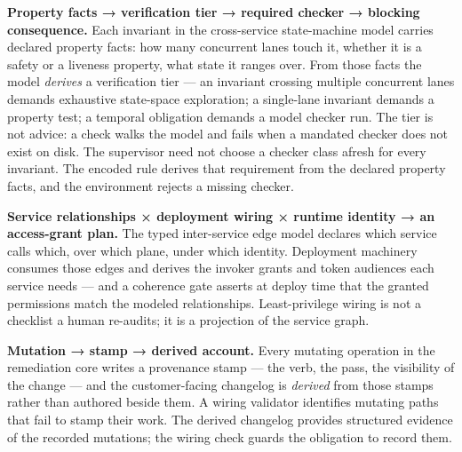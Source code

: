 
\textbf{Property facts → verification tier → required checker → blocking consequence.} Each invariant in the cross-service state-machine model carries declared property facts: how many concurrent lanes touch it, whether it is a safety or a liveness property, what state it ranges over. From those facts the model \emph{derives} a verification tier --- an invariant crossing multiple concurrent lanes demands exhaustive state-space exploration; a single-lane invariant demands a property test; a temporal obligation demands a model checker run. The tier is not advice: a check walks the model and fails when a mandated checker does not exist on disk. The supervisor need not choose a checker class afresh for every invariant. The encoded rule derives that requirement from the declared property facts, and the environment rejects a missing checker.


\textbf{Service relationships × deployment wiring × runtime identity → an access-grant plan.} The typed inter-service edge model declares which service calls which, over which plane, under which identity. Deployment machinery consumes those edges and derives the invoker grants and token audiences each service needs --- and a coherence gate asserts at deploy time that the granted permissions match the modeled relationships. Least-privilege wiring is not a checklist a human re-audits; it is a projection of the service graph.


\textbf{Mutation → stamp → derived account.} Every mutating operation in the remediation core writes a provenance stamp --- the verb, the pass, the visibility of the change --- and the customer-facing changelog is \emph{derived} from those stamps rather than authored beside them. A wiring validator identifies mutating paths that fail to stamp their work. The derived changelog provides structured evidence of the recorded mutations; the wiring check guards the obligation to record them.

